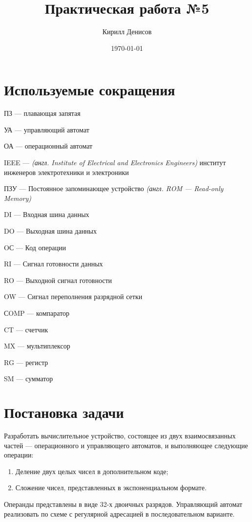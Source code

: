 \documentclass[a4paper,14pt]{extarticle}
\author{Кирилл Денисов}
\title{Практическая работа №5}
\date{\today}
\begin{document}
	
	\def\contentsname{ОГЛАВЛЕНИЕ}
	\setcounter{page}{3} %
	\tableofcontents


	
\begin{center}
	\newpage
\end{center}
\section {Используемые сокращения}
ПЗ --- плавающая запятая

УА --- управляющий автомат

ОА --- операционный автомат

IEEE --- \textit{(англ. Institute of Electrical and Electronics Engineers)} институт инженеров электротехники и электроники

ПЗУ --- Постоянное запоминающее устройство \textit{(англ. ROM --- Read-only Memory)}

DI			---	Входная шина данных

 DO		---	Выходная шина данных
 
 OС		---	Код операции
 
 RI			---	Сигнал готовности данных
 
 RO		---	Выходной сигнал готовности
 

 
 OW		---	Сигнал переполнения разрядной сетки
 
 СOMP		---	компаратор
 
 CT			---	счетчик
 
 MX		---	мультиплексор
 
 RG		---	регистр
 
 
 SM		---	сумматор
\section{Постановка задачи}
Разработать вычислительное устройство, состоящее из  двух взаимосвязанных частей --- операционного и управляющего автоматов, и выполняющее следующие операции:
\begin{enumerate}
	\item Деление двух целых чисел в дополнительном коде;
	\item Сложение чисел, представленных в экспоненциальном формате.
\end{enumerate}
Операнды представлены в виде 32-х двоичных разрядов. Управляющий автомат реализовать по схеме с регулярной адресацией в последовательном варианте.
\newpage
\end{document}
